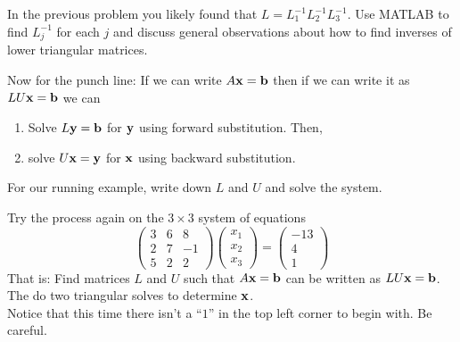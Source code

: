 \begin{problem}
    In the previous problem you likely found that $L = L_1^{-1} L_2^{-1} L_3^{-1}$.  Use
    MATLAB to find $L_j^{-1}$ for each $j$ and discuss general observations about how to
    find inverses of lower triangular matrices.  
\end{problem}

\begin{problem}
    Now for the punch line: If we can write $A {\bf x} = {\bf b}$ then if we can write it as $LU
    {\bf x} = {\bf b}$ we can
    \begin{enumerate}
        \item Solve $L {\bf y} = {\bf b}$ for ${\bf y}$ using forward substitution.  Then,
        \item solve $U {\bf x} = {\bf y}$ for ${\bf x}$ using backward substitution.
    \end{enumerate}
    For our running example, write down $L$ and $U$ and solve the system.
\end{problem}

\begin{problem}
    Try the process again on the $3\times 3$ system of equations
    \[ \begin{pmatrix}
        3 & 6 & 8\\
        2 & 7 & -1 \\
        5 & 2 & 2 
    \end{pmatrix} \begin{pmatrix} x_1 \\ x_2 \\ x_3 \end{pmatrix} = 
        \begin{pmatrix} -13 \\ 4 \\ 1 \end{pmatrix} \]
    That is: Find matrices $L$ and $U$ such that $A {\bf x} = {\bf b}$ can be written as $LU{\bf x} =
    {\bf b}$.  The do two triangular solves to determine ${\bf x}$.\\
    Notice that this time there isn't a ``$1$'' in the top left corner to begin with.  Be
    careful.
\end{problem}


